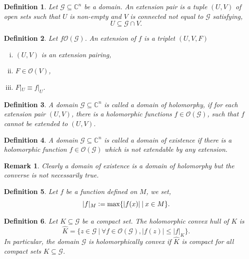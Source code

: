 \documentclass{article}
\newtheorem{definition}{Definition}[section]
\newtheorem{remark}{Remark}[section]
\newcommand{\defeq}{\vcentcolon=}
\newcommand{\C}[0]{\mathbb{C}}
\newcommand{\G}[0]{\mathcal{G}}
\newcommand{\sep}[0]{\:|\:}
\newcommand{\Ouv}[0]{\mathcal{O}}
\begin{document}
\begin{definition}
  Let $\G\subseteq\C^n$ be a domain. An extension pair is a tuple $(U,V)$ of open sets such that $U$ is non-empty and $V$ is connected not equal to $\G$ satisfying, 
  \begin{equation*}
    U\subseteq\G\cap V.
  \end{equation*}
\end{definition}

\begin{definition}
  Let $f\Ouv(\G)$. An extension of $f$ is a triplet $(U,V,F)$
  \begin{enumerate}[i).]
    \item $(U,V)$ is an extension pairing,
    \item $F\in\Ouv(V)$,
    \item $F|_U\equiv f|_U$.
  \end{enumerate}  
\end{definition}

\begin{definition}
  A domain $\G\subseteq\C^n$ is called a domain of holomorphy, if for each extension pair $(U,V)$, there is a holomorphic functions $f\in\Ouv(\G)$, such that $f$ cannot be extended to $(U,V)$.
\end{definition}

\begin{definition}
  A domain $\G\subseteq\C^n$ is called a domain of existence if there is a holomorphic function $f\in\Ouv(\G)$ which is not extendable by any extension.
\end{definition}

\begin{remark}
  Clearly a domain of existence is a domain of holomorphy but the converse is not necessarily true.
\end{remark}

\begin{definition}
  Let $f$ be a function defined on $M$, we set,
  \begin{equation*}
    \vert f\vert_M \defeq \max\{\vert f(x)\vert\sep x\in M\}.
  \end{equation*}
\end{definition}

\begin{definition}
  Let $K\subseteq\G$ be a compact set. The holomorphic convex hull of $K$ is 
  \begin{equation*}
    \hat{K} = \{z\in\G\sep \forall f\in\Ouv(\G), \vert f(z)\vert \leq \vert f\vert_K\}.
  \end{equation*}
  In particular, the domain $\G$ is holomorphically convex if $\hat{K}$ is compact for all compact sets $K\subseteq \G$.
\end{definition}
\end{document}
